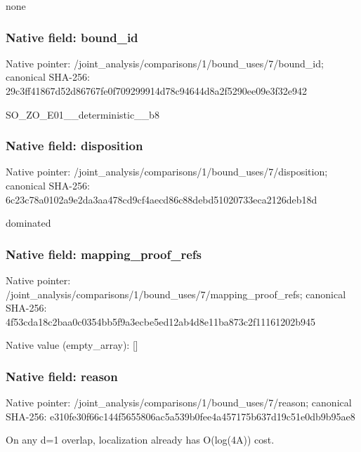 \documentclass[10pt,a4paper]{article}
\begin{document}
\begingroup\raggedright\sloppy none\par\endgroup

\subsubsection{Native field: bound\_\allowbreak{}id}
Native pointer: /joint\_\allowbreak{}analysis/comparisons/1/bound\_\allowbreak{}uses/7/bound\_\allowbreak{}id; canonical SHA-256: 29c3ff41867d52d86767fe0f709299914d78c94644d8a2f5290ee09e3f32e942

\begingroup\raggedright\sloppy SO\_\allowbreak{}ZO\_\allowbreak{}E01\_\allowbreak{}\_\allowbreak{}deterministic\_\allowbreak{}\_\allowbreak{}b8\par\endgroup

\subsubsection{Native field: disposition}
Native pointer: /joint\_\allowbreak{}analysis/comparisons/1/bound\_\allowbreak{}uses/7/disposition; canonical SHA-256: 6c23c78a0102a9e2da3aa478cd9cf4aecd86c88debd51020733eca2126deb18d

\begingroup\raggedright\sloppy dominated\par\endgroup

\subsubsection{Native field: mapping\_\allowbreak{}proof\_\allowbreak{}refs}
Native pointer: /joint\_\allowbreak{}analysis/comparisons/1/bound\_\allowbreak{}uses/7/mapping\_\allowbreak{}proof\_\allowbreak{}refs; canonical SHA-256: 4f53cda18c2baa0c0354bb5f9a3ecbe5ed12ab4d8e11ba873c2f11161202b945

Native value (empty\_\allowbreak{}array): []

\subsubsection{Native field: reason}
Native pointer: /joint\_\allowbreak{}analysis/comparisons/1/bound\_\allowbreak{}uses/7/reason; canonical SHA-256: e310fe30f66c144f5655806ac5a539b0fee4a457175b637d19c51e0db9b95ae8

\begingroup\raggedright\sloppy On any d=\allowbreak{}1 overlap,\allowbreak{} localization already has O(log(4A)) cost.\par\endgroup
\end{document}
